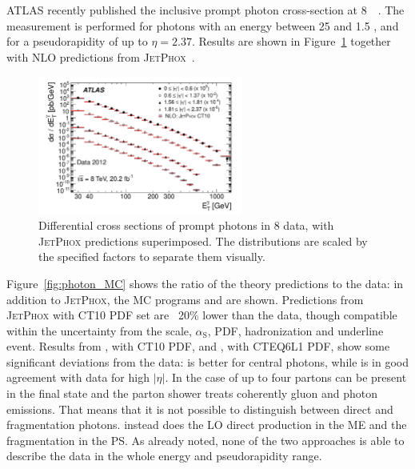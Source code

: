\documentclass{PoS}
\providecommand{\JETPHOX} {{\textsc{JetPhox}}\xspace}
\def\as{\ensuremath{\alpha_\mathrm{S}}\xspace}
\begin{document}
ATLAS recently published the inclusive prompt photon cross-section at 8~\TeV~\cite{Aad:2016xcr}. The measurement is
performed for photons with an energy between 25 \GeV and 1.5 \TeV, and for a pseudorapidity of up to $\eta = 2.37$. 
Results are shown in Figure~\ref{fig:photon} together with NLO predictions from \JETPHOX~\cite{Catani:2002ny}. 
\begin{figure}
\begin{center}
\includegraphics[width=0.6\textwidth]{Figure11.pdf} 
\caption{Differential cross sections of prompt photons in 8 \TeV data, with \JETPHOX predictions superimposed. The
  distributions are scaled by the specified factors to separate them visually. }  
\label{fig:photon}
\end{center}
\end{figure}
Figure~\ref{fig:photon_MC} shows the ratio of the theory predictions to the data: in addition to \JETPHOX, the MC programs
\PYTHIA and \SHERPA are shown. Predictions from \JETPHOX with CT10 PDF set are ~20\% lower than the data, though compatible within the
uncertainty from the scale, \as, PDF, hadronization and underline event. Results from \SHERPA, with CT10 PDF, and \PYTHIA, with
CTEQ6L1 PDF, show some significant deviations from the data: \SHERPA is better for central photons, while
\PYTHIA is in good agreement with data for high $|\eta|$. In the case of \SHERPA up to four partons can be present in the
final state and the parton shower treats coherently gluon and photon emissions. That means that it is not possible to
distinguish between direct and fragmentation photons. \PYTHIA instead does the LO direct production in the ME and the
fragmentation in the PS. As already noted, none of the two approaches is able to describe the data in the whole energy
and pseudorapidity range.
\end{document}
